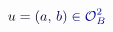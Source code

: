 \documentclass[12pt]{article}
\begin{document}
\makeatletter
\renewcommand*{\@textcolor}[3]{%
  \protect\leavevmode
  \begingroup
    \color#1{#2}#3%
  \endgroup
}
\makeatother
\begin{displaymath}
\mathcolor[RGB]{0,0,15}{u} \mathcolor[RGB]{0,0,30}{=} \mathcolor[RGB]{0,0,45}{(} \mathcolor[RGB]{0,0,60}{a} \mathcolor[RGB]{0,0,75}{,} \, \mathcolor[RGB]{0,0,90}{b} \mathcolor[RGB]{0,0,105}{)} \mathcolor[RGB]{0,0,120}{\in} \mathcal { \mathcolor[RGB]{0,0,135}{O} } _ { \mathcolor[RGB]{0,0,150}{B} } ^ { \mathcolor[RGB]{0,0,165}{2} }
\end{displaymath}
\end{document}
